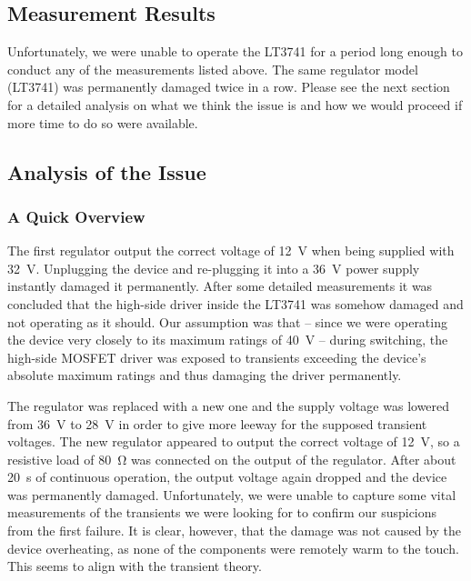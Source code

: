 \subsection{Measurement Results}

Unfortunately, we were unable to  operate the LT3741 for a period long enough to
conduct any of the measurements listed above.  The same regulator model (LT3741)
was  permanently  damaged  twice  in  a row. Please see the next section  for  a
detailed analysis on what we think the issue is and how we would proceed if more
time to do so were available.


\subsection{Analysis of the Issue}

\subsubsection{A Quick Overview}

The  first regulator output the correct voltage  of  \SI{12}{\volt}  when  being
supplied  with  \SI{32}{\volt}.  Unplugging the device and re-plugging it into a
\SI{36}{\volt}  power  supply  instantly  damaged  it  permanently.  After  some
detailed measurements it  was  concluded  that  the  high-side driver inside the
LT3741  was somehow damaged and not operating as it should. Our  assumption  was
that -- since we were  operating  the device very closely to its maximum ratings
of  \SI{40}{\volt} -- during switching, the high-side MOSFET driver was  exposed
to transients exceeding the device's absolute maximum ratings  and thus damaging
the driver permanently.

The regulator was replaced with a new  one  and  the  supply voltage was lowered
from  \SI{36}{\volt}  to \SI{28}{\volt} in order to give  more  leeway  for  the
supposed transient voltages. The new regulator appeared  to  output  the correct
voltage of \SI{12}{\volt}, so a resistive load of \SI{80}{\ohm} was connected on
the  output  of  the  regulator.  After  about  \SI{20}{\second}  of  continuous
operation, the output  voltage  again  dropped  and  the  device was permanently
damaged. Unfortunately, we were unable to capture some vital measurements of the
transients we were looking for to confirm our suspicions from the first failure.
It is clear, however, that the damage was not caused by  the device overheating,
as none of the components were remotely warm  to  the touch. This seems to align
with the transient theory.


